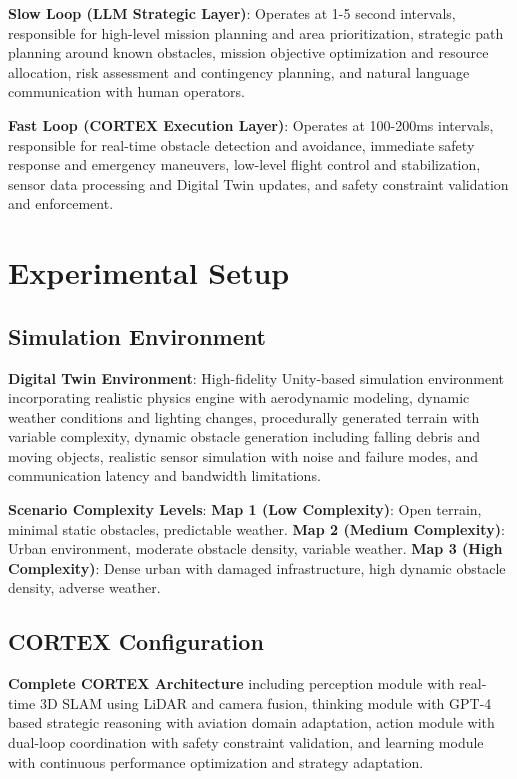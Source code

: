 \textbf{Slow Loop (LLM Strategic Layer)}: Operates at 1-5 second intervals, responsible for high-level mission planning and area prioritization, strategic path planning around known obstacles, mission objective optimization and resource allocation, risk assessment and contingency planning, and natural language communication with human operators.

\textbf{Fast Loop (CORTEX Execution Layer)}: Operates at 100-200ms intervals, responsible for real-time obstacle detection and avoidance, immediate safety response and emergency maneuvers, low-level flight control and stabilization, sensor data processing and Digital Twin updates, and safety constraint validation and enforcement.

\section{Experimental Setup}

\subsection{Simulation Environment}

\textbf{Digital Twin Environment}: High-fidelity Unity-based simulation environment incorporating realistic physics engine with aerodynamic modeling, dynamic weather conditions and lighting changes, procedurally generated terrain with variable complexity, dynamic obstacle generation including falling debris and moving objects, realistic sensor simulation with noise and failure modes, and communication latency and bandwidth limitations.

\textbf{Scenario Complexity Levels}:
\textbf{Map 1 (Low Complexity)}: Open terrain, minimal static obstacles, predictable weather.
\textbf{Map 2 (Medium Complexity)}: Urban environment, moderate obstacle density, variable weather.
\textbf{Map 3 (High Complexity)}: Dense urban with damaged infrastructure, high dynamic obstacle density, adverse weather.

\subsection{CORTEX Configuration}

\textbf{Complete CORTEX Architecture} including perception module with real-time 3D SLAM using LiDAR and camera fusion, thinking module with GPT-4 based strategic reasoning with aviation domain adaptation, action module with dual-loop coordination with safety constraint validation, and learning module with continuous performance optimization and strategy adaptation.

